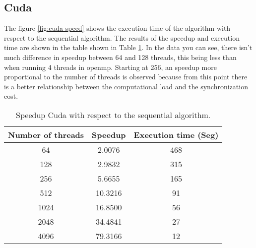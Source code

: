 \documentclass{IEEEtran}
\begin{document}


\subsection{Cuda}

The figure \ref{fig:cuda speed} shows the execution time of the algorithm with respect to the sequential algorithm. The results of the speedup and execution time are shown in the table shown in Table \ref{tab:cuda}. In the data you can see, there isn't much difference in speedup between 64 and 128 threads, this being less than when running 4 threads in openmp. Starting at 256, an speedup more proportional to the number of threads is observed because from this point there is a better relationship between the computational load and the synchronization cost.



\begin{table}[h]
  \centering
  \begin{tabular}{|c|c|c|}
    \hline
    \textbf{Number of threads} & \textbf{Speedup} & \textbf{Execution time (Seg)} \\ \hline
    64                         & 2.0076           & 468                           \\
    128                        & 2.9832           & 315                           \\
    256                        & 5.6655           & 165                           \\
    512                        & 10.3216          & 91                            \\
    1024                       & 16.8500          & 56                            \\
    2048                       & 34.4841          & 27                            \\
    4096                       & 79.3166          & 12                            \\ \hline
  \end{tabular}
  \caption{Speedup Cuda with respect to the sequential algorithm.}
  \label{tab:cuda}
\end{table}
\end{document}
